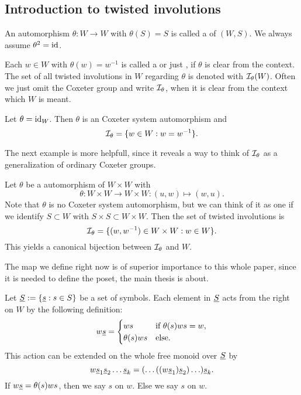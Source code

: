 \subsection{Introduction to twisted involutions}
\label{sec:twisted-involutions-introduction}

\begin{defi}
	An automorphism $\theta : W \to W$ with $\theta(S) = S$ is called a  of $(W,S)$. We always assume $\theta^2 = \operatorname{id}$.
\end{defi}

\begin{defi}
	Each $w \in W$ with $\theta(w) = w^{-1}$ is called a  or just , if $\theta$ is clear from the context. The set of all twisted involutions in $W$ regarding $\theta$ is denoted with $\mathcal{I}_{\theta}(W)$. Often we just omit the Coxeter group and write $\mathcal{I}_{\theta}$, when it is clear from the context which $W$ is meant.
\end{defi}

\begin{exam}
	Let $\theta = \operatorname{id}_W$. Then $\theta$ is an Coxeter system automorphism and
	$$ \mathcal{I}_{\theta} = \{ w \in W : w = w^{-1} \}. $$
\end{exam}

The next example is more helpfull, since it reveals a way to think of $\mathcal{I}_{\theta}$ as a generalization of ordinary Coxeter groups.

\begin{exam}
	Let $\theta$ be a automorphism of $W \times W$ with
	$$ \theta : W \times W \to W \times W : (u,w) \mapsto (w,u). $$
	Note that $\theta$ is no Coxeter system automorphism, but we can think of it as one if we identify $S \subset W$ with $S \times S \subset W \times W$.
	Then the set of twisted involutions is
	$$ \mathcal{I}_{\theta} = \{ (w,w^{-1}) \in W \times W : w \in W \}. $$
	This yields a canonical bijection between $\mathcal{I}_{\theta}$ and $W$.
\end{exam}

The map we define right now is of superior importance to this whole paper, since it is needed to define the poset, the main thesis is about.

\begin{defi}
	Let $\underline{S} := \{ \underline{s} : s \in S \}$ be a set of symbols. Each element in $\underline{S}$ acts from the right on $W$ by the following definition:
	$$ w \underline{s} = \begin{cases}
		ws & \textrm{if } \theta(s)ws = w, \\
		\theta(s)ws & \textrm{else}. \\
	\end{cases} $$
	This action can be extended on the whole free monoid over $\underline{S}$ by
	$$ w \underline{s}_1 \underline{s}_2 \ldots \underline{s}_k = (\ldots ((w \underline{s}_1) \underline{s}_2) \ldots) \underline{s}_k. $$
	If $w \underline{s} = \theta(s)ws$, then we say $s$  on $w$. Else we say $s$  on $w$.
\end{defi}

